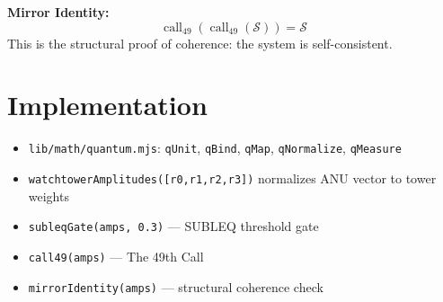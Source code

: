 \documentclass{article}
\begin{document}
\textbf{Mirror Identity:}
\begin{equation}
  \operatorname{call}_{49}(\operatorname{call}_{49}(\mathcal{S})) = \mathcal{S}
\end{equation}
This is the structural proof of coherence: the system is self-consistent.

\section{Implementation}
\begin{itemize}
  \item \texttt{lib/math/quantum.mjs}: \texttt{qUnit}, \texttt{qBind}, \texttt{qMap}, \texttt{qNormalize}, \texttt{qMeasure}
  \item \texttt{watchtowerAmplitudes([r0,r1,r2,r3])} normalizes ANU vector to tower weights
  \item \texttt{subleqGate(amps, 0.3)} --- SUBLEQ threshold gate
  \item \texttt{call49(amps)} --- The 49th Call
  \item \texttt{mirrorIdentity(amps)} --- structural coherence check
\end{itemize}
\end{document}
